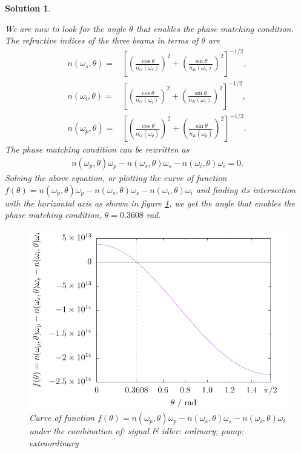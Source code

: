 \documentclass[UTF8,10pt,a4paper]{article}
\theoremstyle{Problem}
\theoremstyle{Solution}
\newtheorem*{sol}{Solution}
\begin{document}
\begin{sol}
\begin{enumerate}
\begin{enumerate}
            We are now to look for the angle $\theta$ that enables the phase matching condition. The refractive indices of the three beams in terms of $\theta$ are
            \begin{align}
                n(\omega_s,\theta)=&\left[\left(\frac{\cos\theta}{n_O(\omega_s)}\right)^2+\left(\frac{\sin\theta}{n_E(\omega_s)}\right)^2\right]^{-1/2},\\
                n(\omega_i,\theta)=&\left[\left(\frac{\cos\theta}{n_O(\omega_i)}\right)^2+\left(\frac{\sin\theta}{n_E(\omega_i)}\right)^2\right]^{-1/2},\\
                n(\omega_p,\theta)=&\left[\left(\frac{\cos\theta}{n_O(\omega_p)}\right)^2+\left(\frac{\sin\theta}{n_E(\omega_p)}\right)^2\right]^{-1/2}.
            \end{align}
            The phase matching condition can be rewritten as
            \begin{align}
                n(\omega_p,\theta)\omega_p-n(\omega_s,\theta)\omega_s-n(\omega_i,\theta)\omega_i=0.
            \end{align}
            Solving the above equation, or plotting the curve of function $f(\theta)=n(\omega_p,\theta)\omega_p-n(\omega_s,\theta)\omega_s-n(\omega_i,\theta)\omega_i$ and finding its intersection with the horizontal axis as shown in figure \ref{phase-matching-I-eoo}, we get the angle that enables the phase matching condition, $\theta=0.3608$ rad.
            \begin{figure}[h]
                \centering
                \includegraphics[width=.5\textwidth]{phase-matching-I-eoo.pdf}
                \caption{Curve of function $f(\theta)=n(\omega_p,\theta)\omega_p-n(\omega_s,\theta)\omega_s-n(\omega_i,\theta)\omega_i$ under the combination of: signal \& idler: ordinary; pump: extraordinary}
                \label{phase-matching-I-eoo}
            \end{figure}


\end{enumerate}
\end{enumerate}
\end{sol}
\end{document}
